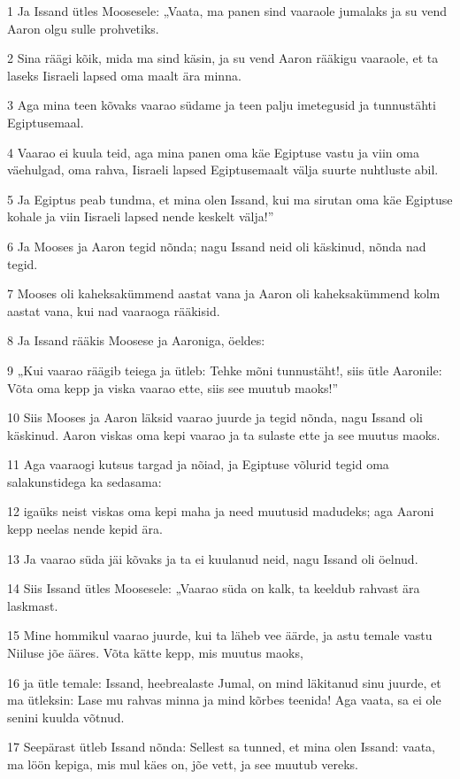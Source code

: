 \par 1 Ja Issand ütles Moosesele: „Vaata, ma panen sind vaaraole jumalaks ja su vend Aaron olgu sulle prohvetiks.
\par 2 Sina räägi kõik, mida ma sind käsin, ja su vend Aaron rääkigu vaaraole, et ta laseks Iisraeli lapsed oma maalt ära minna.
\par 3 Aga mina teen kõvaks vaarao südame ja teen palju imetegusid ja tunnustähti Egiptusemaal.
\par 4 Vaarao ei kuula teid, aga mina panen oma käe Egiptuse vastu ja viin oma väehulgad, oma rahva, Iisraeli lapsed Egiptusemaalt välja suurte nuhtluste abil.
\par 5 Ja Egiptus peab tundma, et mina olen Issand, kui ma sirutan oma käe Egiptuse kohale ja viin Iisraeli lapsed nende keskelt välja!”
\par 6 Ja Mooses ja Aaron tegid nõnda; nagu Issand neid oli käskinud, nõnda nad tegid.
\par 7 Mooses oli kaheksakümmend aastat vana ja Aaron oli kaheksakümmend kolm aastat vana, kui nad vaaraoga rääkisid.
\par 8 Ja Issand rääkis Moosese ja Aaroniga, öeldes:
\par 9 „Kui vaarao räägib teiega ja ütleb: Tehke mõni tunnustäht!, siis ütle Aaronile: Võta oma kepp ja viska vaarao ette, siis see muutub maoks!”
\par 10 Siis Mooses ja Aaron läksid vaarao juurde ja tegid nõnda, nagu Issand oli käskinud. Aaron viskas oma kepi vaarao ja ta sulaste ette ja see muutus maoks.
\par 11 Aga vaaraogi kutsus targad ja nõiad, ja Egiptuse võlurid tegid oma salakunstidega ka sedasama:
\par 12 igaüks neist viskas oma kepi maha ja need muutusid madudeks; aga Aaroni kepp neelas nende kepid ära.
\par 13 Ja vaarao süda jäi kõvaks ja ta ei kuulanud neid, nagu Issand oli öelnud.
\par 14 Siis Issand ütles Moosesele: „Vaarao süda on kalk, ta keeldub rahvast ära laskmast.
\par 15 Mine hommikul vaarao juurde, kui ta läheb vee äärde, ja astu temale vastu Niiluse jõe ääres. Võta kätte kepp, mis muutus maoks,
\par 16 ja ütle temale: Issand, heebrealaste Jumal, on mind läkitanud sinu juurde, et ma ütleksin: Lase mu rahvas minna ja mind kõrbes teenida! Aga vaata, sa ei ole senini kuulda võtnud.
\par 17 Seepärast ütleb Issand nõnda: Sellest sa tunned, et mina olen Issand: vaata, ma löön kepiga, mis mul käes on, jõe vett, ja see muutub vereks.
